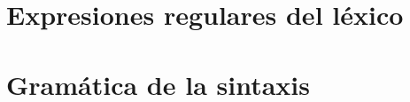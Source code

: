 \documentclass[10pt,a4paper]{article}
\begin{document}
\section{Expresiones regulares del léxico}
\label{sec:Expresiones regulares del léxico}

\section{Gramática de la sintaxis}
\label{sec:Gramática de la sintaxis}
\end{document}
